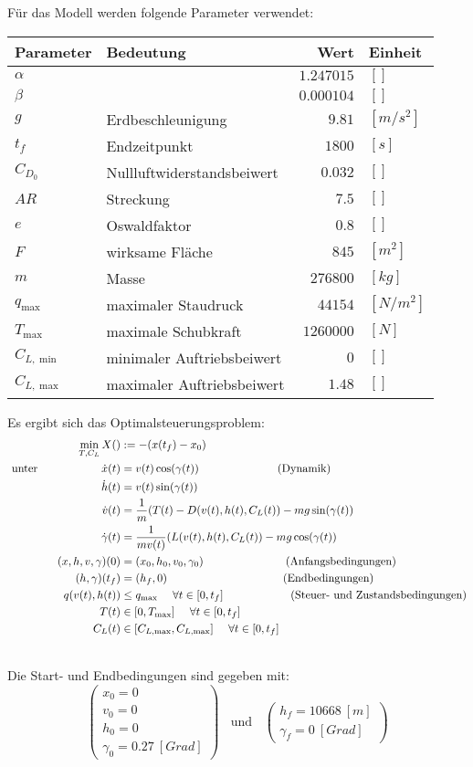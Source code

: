 Für das Modell werden folgende Parameter verwendet:
\begin{center}
\begin{tabular}{|l|l|r|l|}
\hline
Parameter & Bedeutung & Wert & Einheit \\ 
\hline 
$\alpha$ &  & $1.247015$ & $[]$ \\ 
$\beta$ &  & $0.000104$ & $[]$ \\ 
$g$ & Erdbeschleunigung & $9.81$ & $[m/s^2]$ \\ 
$t_f$ & Endzeitpunkt & $1800$ & $[s]$ \\ 
$C_{D_0}$ & Nullluftwiderstandsbeiwert & $0.032$ & $[]$ \\ 
$AR$ & Streckung & $7.5$ & $[]$ \\ 
$e$ & Oswaldfaktor & $0.8$ & $[]$ \\ 
$F$ & wirksame Fläche & $845$ & $[m^2]$ \\ 
$m$ & Masse & $276800$ & $[kg]$ \\ 
$q_{\max}$ & maximaler Staudruck & $44154$ & $[N/m^2]$ \\ 
$T_{\max}$ & maximale Schubkraft & $1260000$ & $[N]$ \\ 
$C_{L, \min}$ & minimaler Auftriebsbeiwert & $0$ & $[]$ \\ 
$C_{L, \max}$ & maximaler Auftriebsbeiwert & $1.48$ & $[]$ \\ 
\hline
\end{tabular} 
\end{center}

Es ergibt sich das Optimalsteuerungsproblem:
\[\begin{split}
\min_{T, C_L} X() &:= -(x(t_f) - x_0) \\\
\text{unter}  \hspace{20mm} \dot{x}(t) &= v(t) \cos(\gamma(t)) \ \qquad \qquad \qquad  \ \ \text{(Dynamik)}\\\
\dot{h}(t) &= v(t) \sin(\gamma(t)) \\\
\dot{v}(t) &= \dfrac{1}{m} (T(t) - D(v(t),h(t),C_L(t)) - mg \sin(\gamma(t)) \\\
\dot{\gamma}(t) &=  \dfrac{1}{mv(t)} (L(v(t),h(t),C_L(t)) - mg \cos(\gamma(t)) \\\
%
(x,h,v,\gamma)(0) &= (x_0,h_0,v_0,\gamma_0) \qquad \qquad \qquad \ \ \ \ \text{(Anfangsbedingungen)}\\\
(h,\gamma)(t_f) &= (h_f,0) \qquad \qquad \qquad \qquad \qquad  \  \text{(Endbedingungen)}\\\
%
q(v(t),h(t)) &\leq q_{\max} \ \ \ \ \forall t \in [0,t_f] \qquad \qquad  \ \ \ \ \ \ \text{(Steuer- und Zustandsbedingungen)}\\\
T(t) &\in [0,T_{\max}] \ \ \ \ \forall t \in [0,t_f] \\\
C_L(t) &\in [C_{L, \max},C_{L, \max}] \ \ \ \ \forall t \in [0,t_f] \\\
\end{split} \]

Die Start- und Endbedingungen sind gegeben mit:
\begin{equation}
\begin{pmatrix}
x_0 = 0 \\ 
v_0 = 0 \\ 
h_0 = 0 \\ 
\gamma_0 = 0.27 \ [Grad]
\end{pmatrix} \ \ \ \ \text{und} \ \ \ \ \begin{pmatrix}
h_f = 10668 \ [m] \\ 
\gamma_f = 0 \ [Grad]
\end{pmatrix}  
\end{equation}